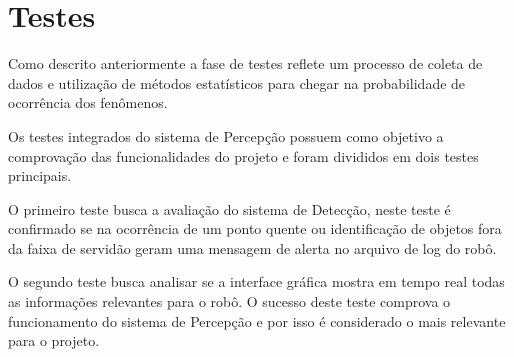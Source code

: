 \section{Testes}
Como descrito anteriormente a fase de testes reflete um processo de coleta de dados e utilização de métodos estatísticos para chegar na probabilidade de ocorrência dos fenômenos.  

Os testes integrados do sistema de Percepção possuem como objetivo a comprovação das funcionalidades do projeto e foram divididos em dois testes principais.

O primeiro teste busca a avaliação do sistema de Detecção, neste teste é confirmado se na ocorrência de um ponto quente ou identificação de objetos fora da faixa de servidão geram uma mensagem de alerta no arquivo de log do robô.

O segundo teste busca analisar se a interface gráfica mostra em tempo real todas as informações relevantes para o robô. O sucesso deste teste comprova o funcionamento do sistema de Percepção e por isso é considerado o mais relevante para o projeto.
 

